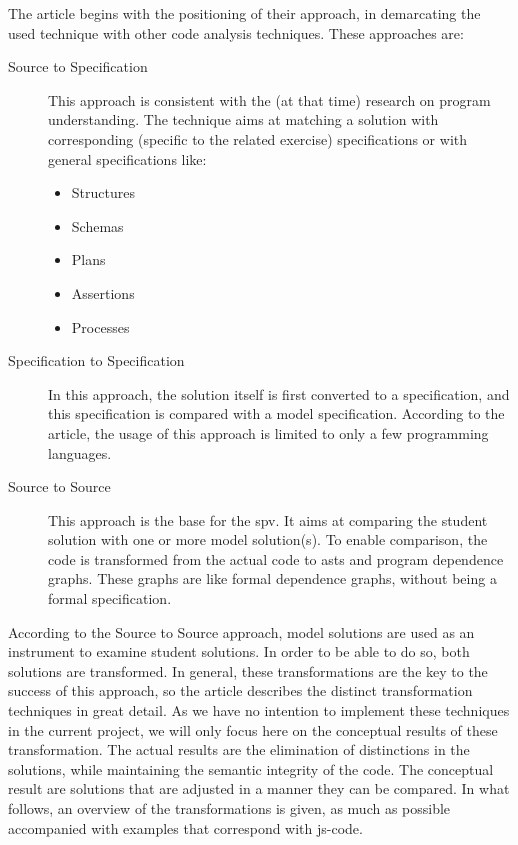 The article begins with the positioning of their approach, in 
demarcating the used technique with other code analysis techniques. These
approaches are:
\begin{description}
	\item[Source to Specification] This approach is consistent with the (at that
	time) research on program understanding. The technique aims at matching a
	\gls{solution} with corresponding (specific to the related exercise) 
	specifications or with general specifications like:
	\begin{itemize}
		\item Structures
		\item Schemas
		\item Plans
		\item Assertions
		\item Processes
	\end{itemize} 
	\item[Specification to Specification] In this approach, the \gls{solution} 
	itself is first converted to a specification, and this specification is 
	compared with a model specification. According to the article, the usage
	of this approach is limited to only a few programming languages.
	\item[Source to Source] This approach is the base for the \gls{spv}. It aims
	at comparing the student \gls{solution} with one or more model \gls{solution}(s).
	To enable comparison, the \gls{code} is transformed from the actual code to
	\glspl{ast} and program dependence graphs. These graphs are like formal 
	dependence graphs, without being a formal specification.
\end{description}
According to the Source to Source approach, model solutions are used as an
instrument to examine student solutions. In order to be able to do so, both 
solutions are transformed. In general, these transformations are the key to
the success of this approach, so the article describes the distinct 
transformation techniques in great detail. As we have no intention to implement
these techniques in the current project, we will only focus here on the 
conceptual results of these transformation. The actual results are the 
elimination of distinctions in the solutions, while maintaining the semantic
integrity of the code. The conceptual result are solutions that are adjusted in 
a manner they can be compared. In what follows, an overview of the
transformations is given, as much as possible accompanied with examples that 
correspond with \gls{js-code}. 

